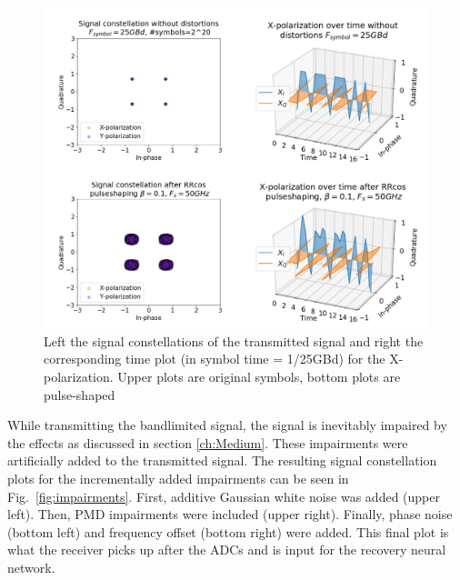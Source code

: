 \documentclass[journal,10pt,twoside, a4paper]{IEEEtran}
\begin{document}
\begin{figure}
    \centering
    \includegraphics[width=\linewidth]{Thesis/images/transmitted.jpg}
    \caption{Left the signal constellations of the transmitted signal and right the corresponding time plot (in symbol time = 1/25GBd) for the X-polarization. Upper plots are original symbols, bottom plots are pulse-shaped}
    \label{fig:transmitted}
\end{figure}

While transmitting the bandlimited signal, the signal is inevitably impaired by the effects as discussed in section \ref{ch:Medium}. These impairments were artificially added to the transmitted signal. The resulting signal constellation plots for the incrementally added impairments can be seen in Fig.~\ref{fig:impairments}. First, additive Gaussian white noise was added (upper left). Then, PMD impairments were included (upper right). Finally, phase noise (bottom left) and frequency offset (bottom right) were added. This final plot is what the receiver picks up after the ADCs and is input for the recovery neural network.
\end{document}
